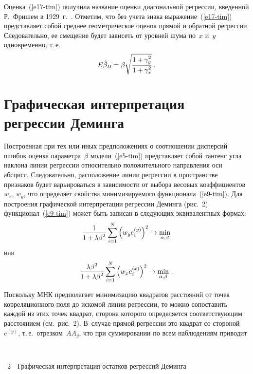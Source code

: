 \begin{multicols}{2}
\begin{enumerate}[1.]
  Оценка~(\ref{e17-tim}) получила название оценки диагональной регрессии,
введенной Р.~Фришем в 1929~г.~\cite{11-tim}. Отметим, что без учета знака
выражение~(\ref{e17-tim}) представляет собой среднее гео\-мет\-ри\-че\-ское
оценок прямой и обратной регрессии. Следовательно, ее смещение будет
зависеть от уровней шума по~$x$ и~$y$ одновременно, т.\,е.
  $$
  E\hat{\beta}_D =  \beta  \sqrt{\displaystyle\frac{\displaystyle 1+\gamma_y^2\mathstrut}{\displaystyle 1+\gamma^2_x\mathstrut}}\,.
  $$
\end{enumerate}

\section{Графическая интерпретация регрессии Деминга}

  Построенная при тех или иных предположениях о соотношении дисперсий
ошибок оценка па\-ра\-мет\-ра~$\beta$ модели~(\ref{e5-tim}) представляет собой
тангенс угла наклона линии регрессии относительно положительного
направления оси абсцисс. Следовательно, расположение линии регрессии в
пространстве признаков будет варьироваться в зависимости от выбора
весовых коэффициентов $w_x$, $w_y$, что определяет свойства
минимизируемого функционала~(\ref{e9-tim}). Для построения графической
интерпретации регрессии Деминга (рис.~2) функционал~(\ref{e9-tim}) может
быть записан в следующих эквивалентных формах:
  \begin{equation}
   \displaystyle\frac{\displaystyle 1\mathstrut}{\displaystyle 1+\lambda\beta^2\mathstrut}\sum\limits_{i=1}^N \left( w_y e_i^{(y)}\right)^2\to
\min\limits_{\alpha,\beta}
  \label{e18-tim}
  \end{equation}
или
\begin{equation}
\displaystyle\frac{\displaystyle \lambda\beta^2\mathstrut}{\displaystyle 1+\lambda\beta^2\mathstrut}\sum\limits_{i=1}^N \left( w_x e_i^{(x)}
\right)^2 \to \min\limits_{\alpha,\beta}\,.
\label{e19-tim}
\end{equation}

  Поскольку МНК предполагает минимизацию квадратов расстояний от
точек корреляционного поля до искомой линии регрессии, то можно
сопоставить каждой из этих точек квадрат, сторона которого определяется
соответствующим расстоянием (см.\ рис.~2). В~случае прямой регрессии это
квадрат со стороной $e^{(y)}$, т.\,е.\ отрезком~$AA_y$, что при
суммировании по всем наблюдениям приводит\linebreak\vspace*{-12pt} 

\pagebreak

\begin{center}  %
\vspace*{-3pt}
\mbox{%
 \epsfxsize=75.632mm
 }
 \end{center}
{{\figurename~2}\ \ \small{Графическая интерпретация остатков регрессий Деминга}}





\end{multicols}
